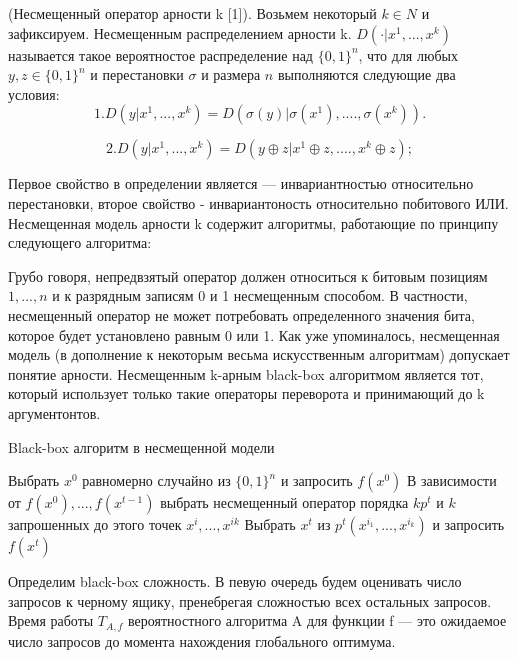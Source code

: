 \begin{definition}
(Несмещенный оператор арности k [1]). Возьмем некоторый
$k \in  N$ и зафиксируем. Несмещенным распределением арности k. $ D (\cdot | x^{1}, ..., x^k)$  называется такое вероятностое распределение над $\{0, 1\}^{n}$, что для любых $y,z \in \{0, 1 \}^n$ и перестановки $\sigma$ и размера $n$ выполняются следующие два условия:
 $$ 1. D ( y | x^{1},..., x^{k} ) = D(\sigma(y) | \sigma(x^{1}),...., \sigma(x^{k})).$$

 $$ 2. D ( y | x^{1},..., x^{k} ) = D(y \oplus z | x^{1} \oplus z,...., x^{k} \oplus z);$$ 

\end{definition}

Первое свойство в определении является — инвариантностью относительно перестановки, второе свойство - инвариантоность относительно побитового ИЛИ. Несмещенная модель арности k содержит алгоритмы, работающие по принципу следующего алгоритма:


Грубо говоря, непредвзятый оператор должен относиться к битовым позициям $1, ..., n$ и к разрядным записям 0 и 1 несмещенным способом. В частности, несмещенный оператор не может потребовать определенного значения бита, которое будет установлено равным 0 или 1. Как уже упоминалось, несмещенная модель (в дополнение к некоторым весьма искусственным алгоритмам) допускает понятие арности. Несмещенным k-арным black-box алгоритмом является тот, который использует только такие операторы переворота и  принимающий до k аргументонтов.


\begin{algorithm}[H]
\caption{Black-box алгоритм в несмещенной модели}\label{lst1}
\begin{algorithmic}
        \State Выбрать $x^0$ равномерно случайно из $\{0,1\}^n$ и запросить $f(x^0)$  
	    \State В зависимости от $f(x^0),...,f(x^{t-1})$ выбрать несмещенный оператор порядка $k p^t$ и $k$ запрошенных до этого точек $x^i,...,x^{ik}$
	    \State Выбрать $x^t$ из $p^{t} (x^{i_1},...,x^{i_k})$ и запросить $f(x^t)$
		\EndFor
\end{algorithmic}
\end{algorithm}

Определим black-box сложность. В певую очередь будем оценивать число запросов к черному ящику, пренебрегая сложностью всех остальных запросов. Время работы $T_{A,f}$ вероятностного алгоритма A для функции f — это ожидаемое число запросов до момента нахождения глобального оптимума.

